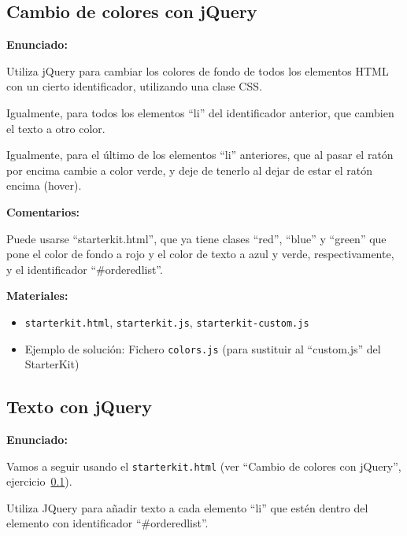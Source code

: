 
\subsection{Cambio de colores con jQuery}
\label{subsec:eje-jquery-colores}

\textbf{Enunciado:}

Utiliza jQuery para cambiar los colores de fondo de todos los elementos HTML con un cierto identificador, utilizando una clase CSS.

Igualmente, para todos los elementos ``li'' del identificador anterior, que cambien el texto a otro color.

Igualmente, para el último de los elementos ``li'' anteriores, que al pasar el ratón por encima cambie a color verde, y deje de tenerlo al dejar de estar el ratón encima (hover).

\textbf{Comentarios:}

Puede usarse ``starterkit.html'', que ya tiene clases ``red'', ``blue'' y ``green'' que pone el color de fondo a rojo y el color de texto a azul y verde, respectivamente, y el identificador ``\#orderedlist''.

\textbf{Materiales:}

\begin{itemize}
\item \verb|starterkit.html|, \verb|starterkit.js|, \verb|starterkit-custom.js|
\item Ejemplo de solución: Fichero \verb|colors.js|
  (para sustituir al ``custom.js'' del StarterKit)
\end{itemize}

\subsection{Texto con jQuery}
\label{subsec:eje-jquery-texto}

\textbf{Enunciado:}

Vamos a seguir usando el \verb|starterkit.html| (ver ``Cambio de colores con jQuery'', ejercicio~\ref{subsec:eje-jquery-colores}).

Utiliza JQuery para añadir texto a cada elemento ``li'' que estén dentro del elemento con identificador ``\#orderedlist''. 

